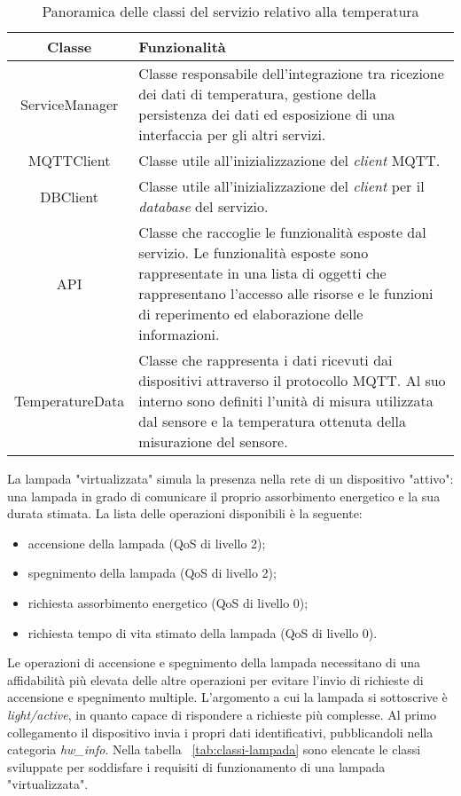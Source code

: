 
\begin{table}[!h]
\caption{Panoramica delle classi del servizio relativo alla temperatura}
\label{tab:classi-temperatura}
\begin{tabularx}{\linewidth}{|c|X|}
\hline
\textbf{Classe} & \textbf{Funzionalità} \\
\hline
ServiceManager & Classe responsabile dell'integrazione tra ricezione dei dati di temperatura, gestione della persistenza dei dati ed esposizione di una interfaccia per gli altri servizi. \\
\hline
MQTTClient & Classe utile all'inizializzazione del \emph{client} MQTT. \\
\hline
DBClient & Classe utile all'inizializzazione del \emph{client} per il \emph{database} del servizio. \\
\hline
API & Classe che raccoglie le funzionalità esposte dal servizio. Le funzionalità esposte sono rappresentate in una lista di oggetti che rappresentano l'accesso alle risorse e le funzioni di reperimento ed elaborazione delle informazioni. \\
\hline
TemperatureData & Classe che rappresenta i dati ricevuti dai dispositivi attraverso il protocollo MQTT. Al suo interno sono definiti l'unità di misura utilizzata dal sensore e la temperatura ottenuta della misurazione del sensore. \\
\hline
\end{tabularx}
\end{table}


La lampada "virtualizzata" simula la presenza nella rete di un dispositivo "attivo": una lampada in grado di comunicare il proprio assorbimento energetico e la sua durata stimata.
La lista delle operazioni disponibili è la seguente:
\begin{itemize}
	\item accensione della lampada (QoS di livello 2);
	\item spegnimento della lampada (QoS di livello 2);
	\item richiesta assorbimento energetico (QoS di livello 0);
	\item richiesta tempo di vita stimato della lampada (QoS di livello 0).
\end{itemize}

Le operazioni di accensione e spegnimento della lampada necessitano di una affidabilità più elevata delle altre operazioni per evitare l'invio di richieste di accensione e spegnimento multiple.
L'argomento a cui la lampada si sottoscrive è \emph{light/active}, in quanto capace di rispondere a richieste più complesse. Al primo collegamento il dispositivo invia i propri dati identificativi, pubblicandoli nella categoria \emph{hw\_info}.
Nella tabella ~\ref{tab:classi-lampada} sono elencate le classi sviluppate per soddisfare i requisiti di funzionamento di una lampada "virtualizzata".

